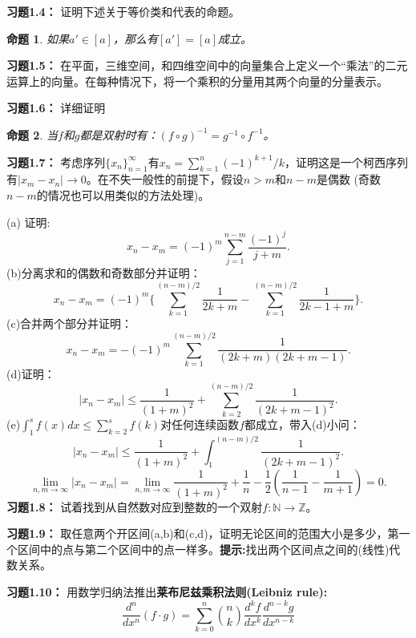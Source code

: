 \documentclass[mathserif,hyperref,UTF8,openany,b5paper]{ctexbook}
\newtheorem{pro}{命题}[section]
\begin{document}
\textbf{习题1.4：}
证明下述关于等价类和代表的命题。\begin{pro}
如果$a'\in[a]$，那么有$[a']=[a]$成立。
\end{pro}
\textbf{习题1.5：}
在平面，三维空间，和四维空间中的向量集合上定义一个“乘法”的二元运算上的向量。在每种情况下，将一个乘积的分量用其两个向量的分量表示。

\textbf{习题1.6：}
详细证明\begin{pro}当$f$和$g$都是双射时有：$(f\circ g)^{-1}=g^{-1}\circ f^{-1}$。
\end{pro}
\textbf{习题1.7：}
考虑序列$\{x_n\}_{n=1}^\infty$有$x_n=\sum^{n}_{k=1} (-1)^{k+1}/k$，证明这是一个柯西序列有$|x_m-x_n|\xrightarrow{} 0$。在不失一般性的前提下，假设$n > m$和$n−m$是偶数
(奇数$n−m$的情况也可以用类似的方法处理)。

(a) 证明: 
 \begin{equation}
 x_n-x_m=(-1)^{m}\sum^{n-m}_{j=1} \frac{(-1)^j}{j+m}.
\end{equation} 
(b)分离求和的偶数和奇数部分并证明：
 \begin{equation}
x_n-x_m=(-1)^{m}\{\sum^{(n-m)/2}_{k=1} \frac{1}{2k+m}-\sum^{(n-m)/2}_{k=1} \frac{1}{2k-1+m}\}.
\end{equation}  
(c)合并两个部分并证明：
\begin{equation}
x_n-x_m=-(-1)^{m}\sum^{(n-m)/2}_{k=1} \frac{1}{(2k+m)(2k+m-1)}.
\end{equation}  
(d)证明：
\begin{equation}
|x_n-x_m|\leq \frac{1}{(1+m)^2}+\sum^{(n-m)/2}_{k=2} \frac{1}{(2k+m-1)^2}.
\end{equation} 
(e)$\int^s_1 f(x)dx\leq \sum^s_{k=2}f(k)$对任何连续函数$f$都成立，带入(d)小问：
\begin{equation}
|x_n-x_m|\leq \frac{1}{(1+m)^2}+\int^{(n-m)/2}_{1} \frac{1}{(2k+m-1)^2}.
\end{equation} 
\begin{equation}
\lim_{n,m\xrightarrow{}\infty}|x_n-x_m|=\lim_{n,m\xrightarrow{}\infty} \frac{1}{(1+m)^2} +\frac{1}{n} -\frac{1}{2}(\frac{1}{n-1}-\frac{1}{m+1})=0.
\end{equation} 
\textbf{习题1.8：}
试着找到从自然数对应到整数的一个双射$f: \mathbb{N}\xrightarrow{}\mathbb{Z}$。

\textbf{习题1.9：}
取任意两个开区间(a,b)和(c,d)，证明无论区间的范围大小是多少，第一个区间中的点与第二个区间中的点一样多。\textbf{提示:}找出两个区间点之间的(线性)代数关系。

\textbf{习题1.10：} 用数学归纳法推出\textbf{莱布尼兹乘积法则(Leibniz rule):}
\begin{equation}
\frac {d^ {n}}{dx^ {n}}  (f \cdot g) =  \sum _ {k=0}^ {n} \binom{n}{k} \frac {d^ {k}f}{dx^ {k}} \frac{d^ {n-k}g}{dx^ {n-k}}
\end{equation} 
\end{document}
